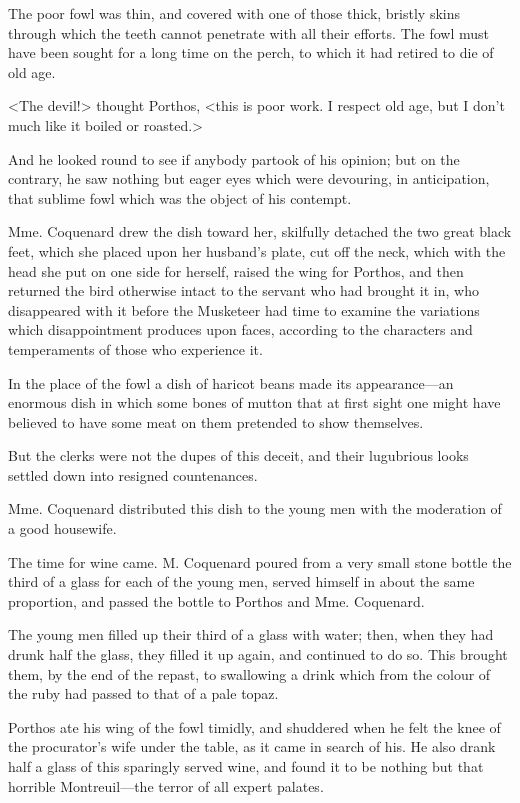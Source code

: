 The poor fowl was thin, and covered with one of those thick, bristly skins through which the teeth cannot penetrate with all their efforts. The fowl must have been sought for a long time on the perch, to which it had retired to die of old age. 

<The devil!> thought Porthos, <this is poor work. I respect old age, but I don't much like it boiled or roasted.> 

And he looked round to see if anybody partook of his opinion; but on the contrary, he saw nothing but eager eyes which were devouring, in anticipation, that sublime fowl which was the object of his contempt. 

Mme. Coquenard drew the dish toward her, skilfully detached the two great black feet, which she placed upon her husband's plate, cut off the neck, which with the head she put on one side for herself, raised the wing for Porthos, and then returned the bird otherwise intact to the servant who had brought it in, who disappeared with it before the Musketeer had time to examine the variations which disappointment produces upon faces, according to the characters and temperaments of those who experience it. 

In the place of the fowl a dish of haricot beans made its appearance---an enormous dish in which some bones of mutton that at first sight one might have believed to have some meat on them pretended to show themselves. 

But the clerks were not the dupes of this deceit, and their lugubrious looks settled down into resigned countenances. 

Mme. Coquenard distributed this dish to the young men with the moderation of a good housewife. 

The time for wine came. M. Coquenard poured from a very small stone bottle the third of a glass for each of the young men, served himself in about the same proportion, and passed the bottle to Porthos and Mme. Coquenard. 

The young men filled up their third of a glass with water; then, when they had drunk half the glass, they filled it up again, and continued to do so. This brought them, by the end of the repast, to swallowing a drink which from the colour of the ruby had passed to that of a pale topaz. 

Porthos ate his wing of the fowl timidly, and shuddered when he felt the knee of the procurator's wife under the table, as it came in search of his. He also drank half a glass of this sparingly served wine, and found it to be nothing but that horrible Montreuil---the terror of all expert palates. 

